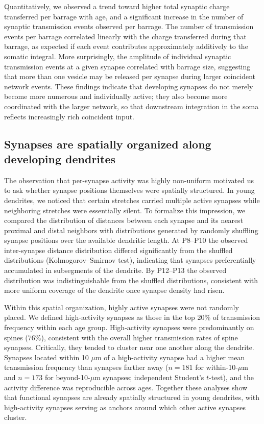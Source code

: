 \documentclass[11pt]{article}
\begin{document}
Quantitatively, we observed a trend toward higher total synaptic charge transferred per barrage with age, and a significant increase in the number of synaptic transmission events observed per barrage. The number of transmission events per barrage correlated linearly with the charge transferred during that barrage, as expected if each event contributes approximately additively to the somatic integral. More surprisingly, the amplitude of individual synaptic transmission events at a given synapse correlated with barrage size, suggesting that more than one vesicle may be released per synapse during larger coincident network events. These findings indicate that developing synapses do not merely become more numerous and individually active; they also become more coordinated with the larger network, so that downstream integration in the soma reflects increasingly rich coincident input.

\subsection{Synapses are spatially organized along developing dendrites}

The observation that per-synapse activity was highly non-uniform motivated us to ask whether synapse positions themselves were spatially structured. In young dendrites, we noticed that certain stretches carried multiple active synapses while neighboring stretches were essentially silent. To formalize this impression, we compared the distribution of distances between each synapse and its nearest proximal and distal neighbors with distributions generated by randomly shuffling synapse positions over the available dendritic length. At P8--P10 the observed inter-synapse distance distribution differed significantly from the shuffled distributions (Kolmogorov--Smirnov test), indicating that synapses preferentially accumulated in subsegments of the dendrite. By P12--P13 the observed distribution was indistinguishable from the shuffled distributions, consistent with more uniform coverage of the dendrite once synapse density had risen.

Within this spatial organization, highly active synapses were not randomly placed. We defined high-activity synapses as those in the top 20\% of transmission frequency within each age group. High-activity synapses were predominantly on spines ($76\%$), consistent with the overall higher transmission rates of spine synapses. Critically, they tended to cluster near one another along the dendrite. Synapses located within 10 $\mu$m of a high-activity synapse had a higher mean transmission frequency than synapses farther away ($n = 181$ for within-10-$\mu$m and $n = 173$ for beyond-10-$\mu$m synapses; independent Student's $t$-test), and the activity difference was reproducible across ages. Together these analyses show that functional synapses are already spatially structured in young dendrites, with high-activity synapses serving as anchors around which other active synapses cluster.
\end{document}
